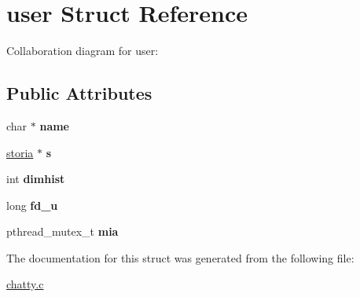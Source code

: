 \hypertarget{structuser}{}\section{user Struct Reference}
\label{structuser}


Collaboration diagram for user\+:
\subsection*{Public Attributes}
\begin{DoxyCompactItemize}
\item 
char $\ast$ {\bfseries name}\hypertarget{structuser_aecdd6f27edd6ce50aec3294428c47aa5}{}\label{structuser_aecdd6f27edd6ce50aec3294428c47aa5}

\item 
\hyperlink{structhistory}{storia} $\ast$ {\bfseries s}\hypertarget{structuser_aa6b5dc17cfce1c9031dd9798bea9e22b}{}\label{structuser_aa6b5dc17cfce1c9031dd9798bea9e22b}

\item 
int {\bfseries dimhist}\hypertarget{structuser_a1ac7b410dcea682ae2097364aad66729}{}\label{structuser_a1ac7b410dcea682ae2097364aad66729}

\item 
long {\bfseries fd\+\_\+u}\hypertarget{structuser_a4162e0dfc4c14bb79e32ce0114830f8f}{}\label{structuser_a4162e0dfc4c14bb79e32ce0114830f8f}

\item 
pthread\+\_\+mutex\+\_\+t {\bfseries mia}\hypertarget{structuser_a1dcc41d7f178aedf6a6ebb9297857c72}{}\label{structuser_a1dcc41d7f178aedf6a6ebb9297857c72}

\end{DoxyCompactItemize}


The documentation for this struct was generated from the following file\+:\begin{DoxyCompactItemize}
\item 
\hyperlink{chatty_8c}{chatty.\+c}\end{DoxyCompactItemize}
